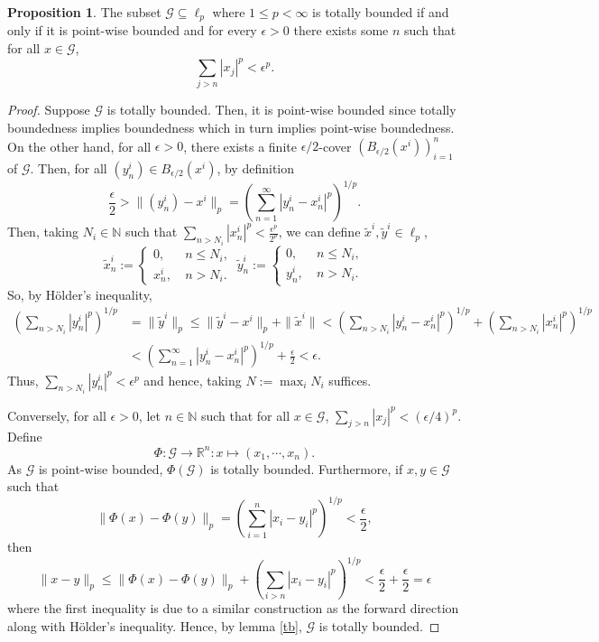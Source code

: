 \documentclass[]{article}
\theoremstyle{definition}
\theoremstyle{definition}
\newtheorem{proposition}{Proposition}[section]
\begin{document}
\begin{proposition}
  The subset \(\mathcal{G} \subseteq \ell_p\) where \(1 \le p < \infty\) is 
  totally bounded if and only if it is point-wise bounded and for every 
  \(\epsilon > 0\) there exists some \(n\) such that for all \(x \in \mathcal{G}\), 
  \[\sum_{j > n} |x_j|^p < \epsilon^p.\]
\end{proposition}
\begin{proof}
  Suppose \(\mathcal{G}\) is totally bounded. Then, it is point-wise 
  bounded since totally boundedness implies boundedness which 
  in turn implies point-wise boundedness. On the other hand, for all 
  \(\epsilon > 0\), there exists a finite \(\epsilon / 2\)-cover 
  \((B_{\epsilon / 2}(x^i))_{i = 1}^n\) of \(\mathcal{G}\). Then, for all 
  \((y_n^i) \in B_{\epsilon / 2}(x^i)\), by definition 
  \[\frac{\epsilon}{2} > \|(y_n^i) - x^i\|_p = 
    \left(\sum_{n = 1}^\infty |y_n^i - x_n^i|^p\right)^{1 / p}.\]
  Then, taking \(N_i \in \mathbb{N}\) such that \(\sum_{n > N_i} |x_n^i|^p < 
  \frac{\epsilon^p}{2^p}\), we can define \(\tilde x^i, \tilde y^i \in \ell_p\),
  \[\tilde x_n^i := 
  \begin{cases}
    0, & \ n \le N_i,\\
    x_n^i, & \ n > N_i.
  \end{cases} \
    \tilde y_n^i := 
  \begin{cases}
    0, & \ n \le N_i,\\
    y_n^i, & \ n > N_i.
  \end{cases}\]
  So, by Hölder's inequality, 
  \[\begin{split}
    \left(\sum_{n > N_i} |y_n^i|^p\right)^{1 / p} & =
    \|\tilde y^i\|_p \le \|\tilde y^i - x^i\|_p + \|\tilde x^i\| < 
    \left(\sum_{n > N_i} |y_n^i - x_n^i|^p\right)^{1 / p} + 
    \left(\sum_{n > N_i} |x_n^i|^p\right)^{1 / p}\\
    & < \left(\sum_{n = 1}^\infty |y_n^i - x_n^i|^p\right)^{1 / p} + 
    \frac{\epsilon}{2} < \epsilon.
  \end{split}\]
  Thus, \(\sum_{n > N_i} |y_n^i|^p < \epsilon^p\) and hence, taking 
  \(N := \max_i N_i\) suffices.

  Conversely, for all \(\epsilon > 0\), let \(n \in \mathbb{N}\) 
  such that for all \(x \in \mathcal{G}\), 
  \(\sum_{j > n} |x_j|^p < (\epsilon / 4)^p\). Define 
  \[\Phi : \mathcal{G} \to \mathbb{R}^n : x \mapsto (x_1, \cdots, x_n).\]
  As \(\mathcal{G}\) is point-wise bounded, \(\Phi(\mathcal{G})\) is totally 
  bounded. Furthermore, if \(x, y \in \mathcal{G}\) such that
  \[\|\Phi(x) - \Phi(y)\|_p = 
    \left(\sum_{i = 1}^n |x_i - y_i|^p\right)^{1 / p} < \frac{\epsilon}{2},\]
  then 
  \[\|x - y\|_p \le \|\Phi(x) - \Phi(y)\|_p + 
  \left(\sum_{i > n} |x_i - y_i|^p\right)^{1 / p} < 
    \frac{\epsilon}{2} + \frac{\epsilon}{2} = \epsilon\]
  where the first inequality is due to a similar construction as the forward 
  direction along with Hölder's inequality. Hence, by lemma \ref{tb}, 
  \(\mathcal{G}\) is totally bounded.
\end{proof}
\end{document}
